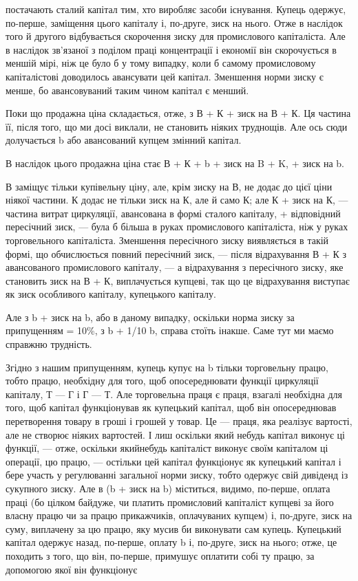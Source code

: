 \parcont{}  %
постачають сталий капітал тим, хто виробляє засоби існування.
Купець одержує, по-перше, заміщення цього капіталу і, по-друге,
зиск на нього. Отже в наслідок того й другого відбувається
скорочення зиску для промислового капіталіста. Але в наслідок
зв’язаної з поділом праці концентрації і економії він скорочується
в меншій мірі, ніж це було б у тому випадку, коли б самому
промисловому капіталістові доводилось авансувати цей капітал.
Зменшення норми зиску є менше, бо авансовуваний таким чином
капітал є менший.

Поки що продажна ціна складається, отже, з В + К + зиск на
В + К. Ця частина її, після того, що ми досі виклали, не становить
ніяких труднощів. Але ось сюди долучається b або авансований
купцем змінний капітал.

В наслідок цього продажна ціна стає В + К + b + зиск на
B + K, + зиск на b.

В заміщує тільки купівельну ціну, але, крім зиску на В, не
додає до цієї ціни ніякої частини. К додає не тільки зиск на К,
але й само К; але К + зиск на К, — частина витрат циркуляції,
авансована в формі сталого капіталу, + відповідний пересічний
зиск, — була б більша в руках промислового капіталіста, ніж у
руках торговельного капіталіста. Зменшення пересічного зиску
виявляється в такій формі, що обчислюється повний пересічний
зиск, — після відрахування В + К з авансованого промислового
капіталу, — а відрахування з пересічного зиску, яке становить
зиск на В + К, виплачується купцеві, так що це відрахування
виступає як зиск особливого капіталу, купецького капіталу.

Але з b + зиск на b, або в даному випадку, оскільки норма
зиску за припущенням = 10\%, з b + 1/10 b, справа стоїть інакше.
Саме тут ми маємо справжню трудність.

Згідно з нашим припущенням, купець купує на b тільки торговельну
працю, тобто працю, необхідну для того, щоб опосереднювати
функції циркуляції капіталу, Т — Г і Г — Т. Але торговельна
праця є праця, взагалі необхідна для того, щоб капітал
функціонував як купецький капітал, щоб він опосереднював перетворення
товару в гроші і грошей у товар. Це — праця, яка реалізує
вартості, але не створює ніяких вартостей. І лиш оскільки
який небудь капітал виконує ці функції, — отже, оскільки якийнебудь
капіталіст виконує своїм капіталом ці операції, цю працю,
— остільки цей капітал функціонує як купецький капітал
і бере участь у регулюванні загальної норми зиску, тобто одержує
свій дивіденд із сукупного зиску. Але в (b + зиск на b) міститься,
видимо, по-перше, оплата праці (бо цілком байдуже, чи платить
промисловий капіталіст купцеві за його власну працю чи за працю
прикажчиків, оплачуваних купцем) і, по-друге, зиск на суму,
виплачену за цю працю, яку мусив би виконувати сам купець.
Купецький капітал одержує назад, по-перше, оплату b і, по-друге,
зиск на нього; отже, це походить з того, що він, по-перше, примушує
оплатити собі ту працю, за допомогою якої він функціонує
\parbreak{}  %
